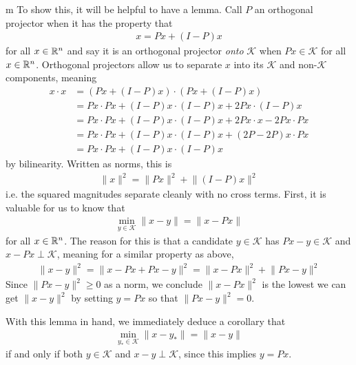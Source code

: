 \documentclass[11pt]{article}
\begin{document}
\begin{my proof}{m}
To show this, it will be helpful to have a lemma. Call $P$ an orthogonal projector when it has the property that \begin{gather*}
x = Px + (I - P)x
\end{gather*}
for all $x \in \mathbb{R}^n$ and say it is an orthogonal projector \emph{onto} $\mathcal{K}$ when $Px \in \mathcal{K}$ for all $x \in \mathbb{R}^n$. Orthogonal projectors allow us to separate $x$ into its $\mathcal{K}$ and non-$\mathcal K$ components, meaning \begin{align*}
x \cdot x &= (P x + (I - P)x) \cdot (Px + (I - P) x) \\
&= Px \cdot Px + (I - P) x \cdot (I - P) x + 2 Px \cdot (I - P) x \\ 
&= Px \cdot Px + (I - P) x \cdot (I - P) x + 2 Px \cdot x - 2 Px \cdot Px \\
&= Px \cdot Px + (I - P) x \cdot (I - P) x + (2 P - 2P )x \cdot Px \\
&= Px \cdot Px + (I - P) x \cdot (I - P) x 
\end{align*} by bilinearity. Written as norms, this is \begin{gather*}
\lVert x \rVert^2 = \lVert Px \rVert^2 + \lVert (I - P)x \rVert^2
\end{gather*} i.e. the squared magnitudes separate cleanly with no cross terms. First, it is valuable for us to know that \begin{gather*}
\min_{y \in \mathcal K}\lVert x - y \rVert = \lVert x - Px \rVert
\end{gather*}
for all $x \in \mathbb{R}^n$. The reason for this is that a candidate $y \in \mathcal K$ has $Px - y \in \mathcal K$ and $x - Px \perp \mathcal K$, meaning for a similar property as above, \begin{gather*}
\lVert x - y \rVert^2 = \lVert x - Px + Px -  y \rVert^2 = \lVert x - Px\rVert^2 + \lVert Px - y \rVert^2
\end{gather*}
Since $\lVert Px - y \rVert^2 \ge 0$ as a norm, we conclude $\lVert x - Px\rVert^2$ is the lowest we can get $\lVert x - y \rVert^2$ by setting $y = Px$ so that $\lVert Px - y \rVert^2 = 0$.

With this lemma in hand, we immediately deduce a corollary that \begin{gather*}
\min_{y_* \in \mathcal K} \lVert x - y_* \rVert = \lVert x - y \rVert
\end{gather*}
if and only if both $y \in \mathcal K$ and $x - y \perp \mathcal K$, since this implies $y = Px$.


\end{my proof}
\end{document}
